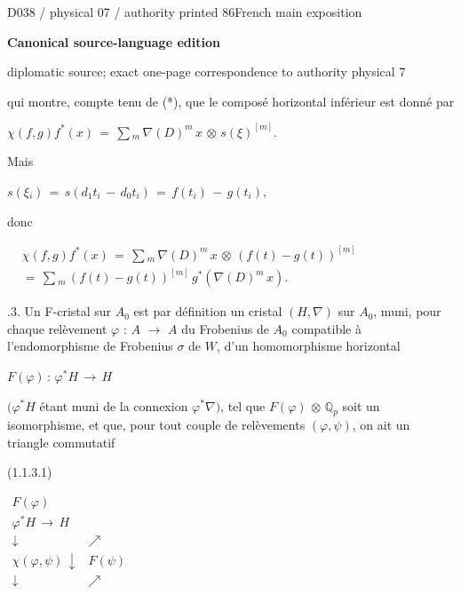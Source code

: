 \documentclass[9pt]{article}
\newcommand{\CanonText}[1]{\par{\fontsize{8.0}{9.35}\selectfont\RaggedRight #1\par}\vspace{2.2pt}}
\newcommand{\CanonDisplay}[1]{\par\vspace{1.2pt}\begin{center}{\fontsize{7.2}{8.4}\selectfont\(\displaystyle #1\)}\end{center}\vspace{1.2pt}}
\newenvironment{CanonMathBlock}{\par\vspace{1.2pt}\begin{center}\fontsize{6.8}{8.0}\selectfont\(\displaystyle}{\)\end{center}\vspace{1.2pt}}
\newcommand{\LayerTitle}{Canonical source-language edition}
\begin{document}
\noindent\begin{minipage}[t][\dimexpr\textheight-5pt\relax][t]{\textwidth}
{\sffamily\fontsize{7.3}{8.2}\selectfont\color{Quiet} D038 / physical 07 / authority printed 86\hfill French main exposition}
\par{}\vspace{4.5pt}
{\sffamily\fontsize{10.4}{11.6}\selectfont\bfseries\color{Accent} \LayerTitle}
\par{\sffamily\fontsize{6.7}{7.7}\selectfont\color{Quiet} diplomatic source; exact one-page correspondence to authority physical 7}
\vspace{5pt}
\CanonText{qui montre, compte tenu de (*), que le composé horizontal inférieur est donné par}
\CanonDisplay{\chi{}(f,g)f^{*}(x)\,=\,\sum{}_{m}\,\nabla{}(D)^{m}\,x\,\otimes{}\,s(\xi{})^{[m]}.}
\CanonText{Mais}
\CanonDisplay{s(\xi{}_{i})\,=\,s(d_{1}t_{i}\,-\,d_{0}t_{i})\,=\,f(t_{i})\,-\,g(t_{i}),}
\CanonText{donc}
\begin{CanonMathBlock}
\begin{aligned}
& \chi{}(f,g)f^{*}(x)\,=\,\sum{}_{m}\,\nabla{}(D)^{m}\,x\,\otimes{}\,(f(t)-g(t))^{[m]}\\
& =\,\sum{}_{m}\,(f(t)-g(t))^{[m]}\,g^{*}(\nabla{}(D)^{m}\,x).
\end{aligned}
\end{CanonMathBlock}
\CanonText{1.1.3. Un F-cristal sur \(A_{0}\) est par définition un cristal \((H,\nabla{})\) sur \(A_{0}\), muni, pour chaque relèvement \(\varphi{}\) : \(A\) \(\to{}\) \(A\) du Frobenius de \(A_{0}\) compatible à l'endomorphisme de Frobenius \(\sigma{}\) de \(W\), d'un homomorphisme horizontal}
\CanonDisplay{F(\varphi{})\,:\,\varphi{}^{*}H\,\to{}\,H}
\CanonText{\((\varphi{}^{*}H\) étant muni de la connexion \(\varphi{}^{*}\nabla{})\), tel que \(F(\varphi{})\) \(\otimes{}\) \(\mathbb{Q}_{p}\) soit un isomorphisme, et que, pour tout couple de relèvements \((\varphi{},\psi{})\), on ait un triangle commutatif}
\CanonText{(1.1.3.1)}
\begin{CanonMathBlock}
\begin{array}{cc}
F(\varphi{}) & {}\\
\varphi{}^{*}H\,\longrightarrow{}\,H & {}\\
\downarrow{} & \nearrow{}\\
\chi{}(\varphi{},\psi{})\,\downarrow{} & F(\psi{})\\
\downarrow{} & \nearrow{}\\

\end{array}
\end{CanonMathBlock}
\end{minipage}
\end{document}
